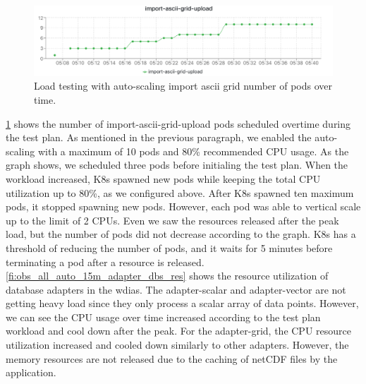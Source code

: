 \begin{figure}[htp]
    \centering
    \includegraphics[width=1.0\textwidth]{results/obs/all_auto/obs_all_auto_15m_import_grid_pod.png}
    \caption{Load testing with auto-scaling import ascii grid number of pods over time.}
    \label{fi:obs_all_auto_15m_import_grid_pod}
\end{figure}

\cref{fi:obs_all_auto_15m_import_grid_pod} shows the number of import-ascii-grid-upload pods scheduled overtime during the test plan. As mentioned in the previous paragraph, we enabled the auto-scaling with a maximum of 10 pods and 80\% recommended CPU usage. As the graph shows, we scheduled three pods before initialing the test plan. When the workload increased, K8s spawned new pods while keeping the total CPU utilization up to 80\%, as we configured above. After K8s spawned ten maximum pods, it stopped spawning new pods. However, each pod was able to vertical scale up to the limit of 2 CPUs. Even we saw the resources released after the peak load, but the number of pods did not decrease according to the graph. K8s has a threshold of reducing the number of pods, and it waits for 5 minutes before terminating a pod after a resource is released. \cref{fi:obs_all_auto_15m_adapter_dbs_res} shows the resource utilization of database adapters in the \acrshort{wdias}. The adapter-scalar and adapter-vector are not getting heavy load since they only process a scalar array of data points. However, we can see the CPU usage over time increased according to the test plan workload and cool down after the peak. For the adapter-grid, the CPU resource utilization increased and cooled down similarly to other adapters. However, the memory resources are not released due to the caching of netCDF files by the application.

